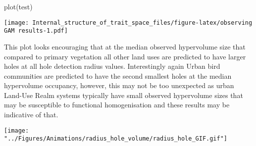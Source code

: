 \documentclass[
]{article}
\newenvironment{Shaded}{\begin{snugshade}}{\end{snugshade}}
\newcommand{\FunctionTok}[1]{\textcolor[rgb]{0.00,0.00,0.00}{#1}}
\newcommand{\NormalTok}[1]{#1}
\begin{document}
\begin{Shaded}
\begin{Highlighting}[]
\FunctionTok{plot}\NormalTok{(test)}
\end{Highlighting}
\end{Shaded}

\texttt{[image: Internal\_structure\_of\_trait\_space\_files/figure-latex/observing GAM results-1.pdf]}

This plot looks encouraging that at the median observed hypervolume size
that compared to primary vegetation all other land uses are predicted to
have larger holes at all hole detection radius values. Interestingly
again Urban bird communities are predicted to have the second smallest
holes at the median hypervolume occupancy, however, this may not be too
unexpected as urban Land-Use Realm systems typically have small observed
hypervolume sizes that may be susceptible to functional homogenisation
and these results may be indicative of that.

\texttt{[image: "../Figures/Animations/radius\_hole\_volume/radius\_hole\_GIF.gif"]}
\end{document}
